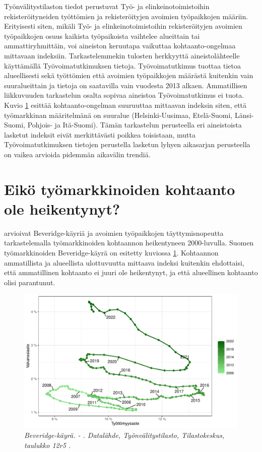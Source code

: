 \documentclass[12pt]{article}
\newcommand{\lastdatamonth}{\unskip}
\newcommand{\firstdatamonth}{\unskip}
\newcommand{\newcaption}[1]{\caption{\textit{\footnotesize{#1}}}}
\begin{document}
Työnvälitystilaston tiedot perustuvat Työ- ja elinkeinotoimistoihin rekisteröityneiden työttömien ja rekisteröityjen avoimien työpaikkojen määriin. Erityisesti siten, mikäli Työ- ja elinkeinotoimistoihin rekisteröityjen avoimien työpaikkojen osuus kaikista työpaikoista vaihtelee alueittain tai ammattiryhmittäin, voi aineiston keruutapa vaikuttaa kohtaanto-ongelmaa mittavaan indeksiin. Tarkastelemmekin tulosten herkkyyttä aineistolähteelle käyttämällä Työvoimatutkimuksen tietoja. Työvoimatutkimus tuottaa tietoa alueellisesti sekä työttömien että avoimien työpaikkojen määrästä kuitenkin vain suuralueittain ja tietoja on saatavilla vain vuodesta 2013 alkaen. Ammatillisen liikkuvuuden tarkastelun osalta sopivaa aineistoa Työvoimatutkimus ei tuota. Kuvio \ref{fig:ld0923g} esittää kohtaanto-ongelman suuruuttaa mittaavan indeksin siten, että työmarkkinan määritelmänä on suuralue (Helsinki-Uusimaa, Etelä-Suomi, Länsi-Suomi, Pohjois- ja Itä-Suomi). Tämän tarkastelun perusteella eri aineistoista lasketut indeksit eivät merkittävästi poikkea toisistaan, mutta Työvoimatutkimuksen tietojen perustella lasketun lyhyen aikasarjan perusteella on vaikea arvioida pidemmän aikavälin trendiä.

\section{Eikö työmarkkinoiden kohtaanto ole heikentynyt?} \label{section:eikö työmarkkinoiden kohtaanto ole heikentynyt}

 arvioivat Beveridge-käyriä ja avoimien työpaikkojen täyttymisnopeutta tarkastelemalla työmarkkinoiden kohtaannon heikentyneen 2000-luvulla. Suomen työmarkkinoiden Beveridge-käyrä on esitetty kuviossa \ref{fig:ld0923g}. Kohtaannon ammatillista ja alueellista ulottuvuutta mittaava indeksi kuitenkin ehdottaisi, että ammatillinen kohtaanto ei juuri ole heikentynyt, ja että alueellinen kohtaanto olisi parantunut. 

\begin{figure}
\centering
\includegraphics[scale = 0.8]{../kuviot/beveridge_curve.pdf}
    \newcaption{Beveridge-käyrä. \protect  \firstdatamonth \phantom{} - \protect\lastdatamonth. Datalähde, Työnvälitystilasto, Tilastokeskus, taulukko 12r5 \protect \cite{svt2011}.}
   \label{fig:ld0923g}
\end{figure}
\end{document}
